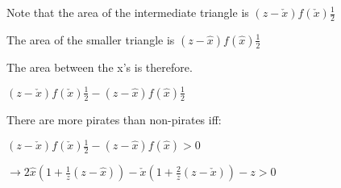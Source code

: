 \documentclass{article}
\begin{document}
Note that the area of the intermediate triangle is $(z-\check{x})f(\check{x})\frac{1}{2}$

The area of the smaller triangle is $(z-\hat{x})f(\hat{x})\frac{1}{2}$

The area between the x's is therefore. 

$(z-\check{x})f(\check{x})\frac{1}{2}-(z-\hat{x})f(\hat{x})\frac{1}{2}$

There are more pirates than non-pirates iff:

$(z-\check{x})f(\check{x})\frac{1}{2}-(z-\hat{x})f(\hat{x}) > 0$

$\rightarrow 2\hat{x}(1+\frac{1}{z}(z-\hat{x}))-\check{x}(1+\frac{2}{z}(z-\check{x}))-z>0$
\end{document}
